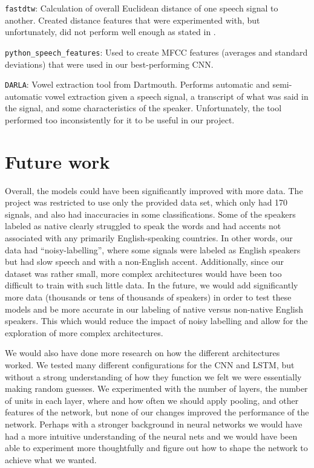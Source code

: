 \documentclass{article}
\begin{document}
\texttt{fastdtw}: Calculation of overall Euclidean distance of one speech signal to another.
Created distance features that were experimented with, but unfortunately, did not perform well enough as stated in .

\texttt{python\_speech\_features}: Used to create MFCC features (averages and standard deviations) that were used in our best-performing CNN.

\texttt{DARLA}: Vowel extraction tool from Dartmouth.
Performs automatic and semi-automatic vowel extraction given a speech signal, a transcript of what was said in the signal, and some characteristics of the speaker.
Unfortunately, the tool performed too inconsistently for it to be useful in our project.

\section{Future work}
\label{sec:future}

Overall, the models could have been significantly improved with more data.
The project was restricted to use only the provided data set, which only had 170 signals, and also had inaccuracies in some classifications.
Some of the speakers labeled as native clearly struggled to speak the words and had accents not associated with any primarily English-speaking countries.
In other words, our data had “noisy-labelling”, where some signals were labeled as English speakers but had slow speech and with a non-English accent.
Additionally, since our dataset was rather small, more complex architectures would have been too difficult to train with such little data.
In the future, we would add significantly more data (thousands or tens of thousands of speakers) in order to test these models  and be more accurate in our labeling of native versus non-native English speakers.
This which would reduce the impact of noisy labelling and allow for the exploration of more complex architectures.

We would also have done more research on how the different architectures worked.
We tested many different configurations for the CNN and LSTM, but without a strong understanding of how they function we felt we were essentially making random guesses.
We experimented with the number of layers, the number of units in each layer, where and how often we should apply pooling, and other features of the network, but none of our changes improved the performance of the network.
Perhaps with a stronger background in neural networks we would have had a more intuitive understanding of the neural nets and we would have been able to experiment more thoughtfully and figure out how to shape the network to achieve what we wanted.
\end{document}
